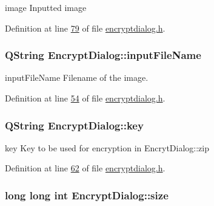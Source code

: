 image Inputted image 



Definition at line \hyperlink{encryptdialog_8h_source_l00079}{79} of file \hyperlink{encryptdialog_8h_source}{encryptdialog.\+h}.

\subsubsection[{\texorpdfstring{input\+File\+Name}{inputFileName}}]{\setlength{\rightskip}{0pt plus 5cm}Q\+String Encrypt\+Dialog\+::input\+File\+Name}\hypertarget{class_encrypt_dialog_a859b1bc2f032a247632b879bf8663d0b}{}\label{class_encrypt_dialog_a859b1bc2f032a247632b879bf8663d0b}


input\+File\+Name Filename of the image. 



Definition at line \hyperlink{encryptdialog_8h_source_l00054}{54} of file \hyperlink{encryptdialog_8h_source}{encryptdialog.\+h}.

\subsubsection[{\texorpdfstring{key}{key}}]{\setlength{\rightskip}{0pt plus 5cm}Q\+String Encrypt\+Dialog\+::key}\hypertarget{class_encrypt_dialog_a1afdef3c665fb0d0fae06d1df8e84951}{}\label{class_encrypt_dialog_a1afdef3c665fb0d0fae06d1df8e84951}


key Key to be used for encryption in Encryt\+Dialog\+::zip 



Definition at line \hyperlink{encryptdialog_8h_source_l00062}{62} of file \hyperlink{encryptdialog_8h_source}{encryptdialog.\+h}.

\subsubsection[{\texorpdfstring{size}{size}}]{\setlength{\rightskip}{0pt plus 5cm}long long int Encrypt\+Dialog\+::size}\hypertarget{class_encrypt_dialog_a7fff26f838ab50f807744cd2c4bed033}{}\label{class_encrypt_dialog_a7fff26f838ab50f807744cd2c4bed033}


